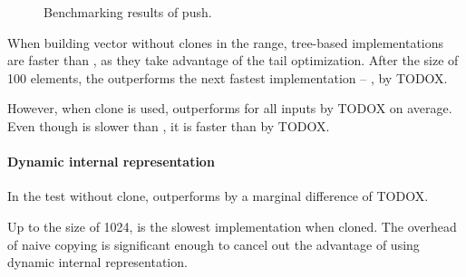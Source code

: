 \begin{figure}[!htbp]
\begin{adjustbox}{width=\textwidth}
    \end{adjustbox}
    
    \caption{Benchmarking results of push.}
    \label{fig:push}
\end{figure}

When building vector without clones in the \range{[10, 100]} range, tree-based implementations are faster than \stdvec{}, as they take advantage of the tail optimization. After the size of 100 elements, the \stdvec{} outperforms the next fastest implementation -- \pvec{}, by TODOX.

However, when clone is used, \rbvec{} outperforms \stdvec{} for all inputs by TODOX on average. Even though \imrsvec{} is slower than \rbvec{}, it is faster than \pvec{} by TODOX. 

\paragraph{Dynamic internal representation}
In the test without clone, \pvec{} outperforms \rbvec{} by a marginal difference of TODOX. 

Up to the size of 1024, \pvec{} is the slowest implementation when cloned. The overhead of naive copying is significant enough to cancel out the advantage of using dynamic internal representation.


